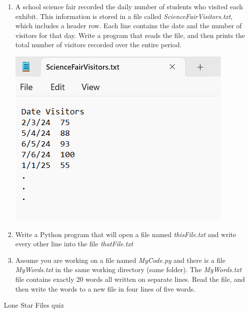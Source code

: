 \documentclass{article}
\begin{document}
\begin{enumerate}
	\item 
		A school science fair recorded the daily number of students who visited each exhibit.  
		This information is stored in a file called \textit{ScienceFairVisitors.txt}, which includes a header row.  
		Each line contains the date and the number of visitors for that day.  
		Write a program that reads the file, and then prints the total number of visitors recorded over the entire period.
		
		\begin{flushright}
			\includegraphics[scale=.65]{imgs/ScienceFairVisitorsData.PNG}
		\end{flushright}


	\item 
		Write a Python program that will open a file named \textit{thisFile.txt} and write every 
		other line into the file
		\textit{thatFile.txt}

	\item
		Assume you are working on a file named \textit{MyCode.py} and there is a file \textit{MyWords.txt} in the same 
		working directory (same folder). The \textit{MyWords.txt} file contains exactly 20 words all written on separate
		lines. Read the file, and then write the words to a new file in four lines of five words.






\end{enumerate}
\pagebreak
Lone Star \hfill Files quiz\\
\end{document}
